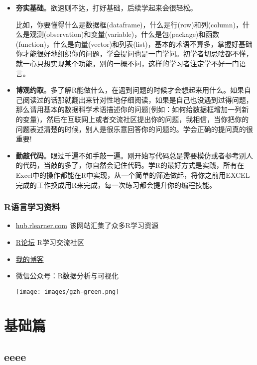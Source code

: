 \documentclass[
  letterpaper,
  DIV=11,
  numbers=noendperiod]{scrreprt}
\begin{document}
\begin{itemize}
\item
  \textbf{夯实基础}。欲速则不达，打好基础，后续学起来会很轻松。

  比如，你要懂得什么是数据框(dataframe)，什么是行(row)和列(column)，什么是观测(observation)和变量(variable)，什么是包(package)和函数(function)，什么是向量(vector)和列表(list)，基本的术语不算多，掌握好基础你才能很好地组织你的问题，学会提问也是一门学问。初学者切忌啥都不懂，就一心只想实现某个功能，别的一概不问，这样的学习者注定学不好一门语言。
\item
  \textbf{博观约取}。多了解R能做什么，在遇到问题的时候才会想起来用什么。如果自己阅读过的话那就翻出来针对性地仔细阅读，如果是自己也没遇到过得问题，那么请用基本的数据科学术语描述你的问题(例如：如何给数据框增加一列新的变量)，然后在互联网上或者交流社区提出你的问题，我相信，当你把你的问题表述清楚的时候，别人是很乐意回答你的问题的。学会正确的提问真的很重要!
\item
  \textbf{勤敲代码}。眼过千遍不如手敲一遍。刚开始写代码总是需要模仿或者参考别人的代码，当敲的多了，你自然会记住代码。学R的最好方式是实践，所有在Excel中的操作都能在R中实现，从一个简单的筛选做起，将你之前用EXCEL完成的工作换成用R来完成，每一次练习都会提升你的编程技能。
\end{itemize}

\section*{R语言学习资料}\label{rux8bedux8a00ux5b66ux4e60ux8d44ux6599}


\begin{itemize}
\item
  \href{https://hub.rlearner.com}{hub.rlearner.com}
  该网站汇集了众多R学习资源
\item
  \href{https://rlearner.com}{R论坛} R学习交流社区
\item
  \href{https://blog.rlearner.com/r-index.html}{我的博客}
\item
  微信公众号：R数据分析与可视化

  \texttt{[image: images/gzh-green.png]}
\end{itemize}

\part{基础篇}

\chapter{eeee}\label{eeee}
\end{document}
